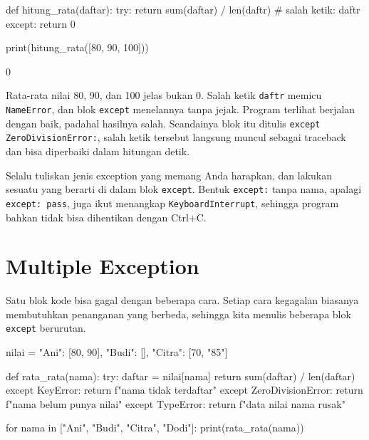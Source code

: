 \begin{kode}
def hitung_rata(daftar):
    try:
        return sum(daftar) / len(daftr)      # salah ketik: daftr
    except:
        return 0

print(hitung_rata([80, 90, 100]))
\end{kode}

\begin{keluaran}
0
\end{keluaran}

Rata-rata nilai 80, 90, dan 100 jelas bukan 0. Salah ketik \texttt{daftr} memicu \texttt{NameError}, dan blok \texttt{except} menelannya tanpa jejak. Program terlihat berjalan dengan baik, padahal hasilnya salah. Seandainya blok itu ditulis \texttt{except ZeroDivisionError:}, salah ketik tersebut langsung muncul sebagai traceback dan bisa diperbaiki dalam hitungan detik.

\begin{penting}
Selalu tuliskan jenis exception yang memang Anda harapkan, dan lakukan sesuatu yang berarti di dalam blok \texttt{except}. Bentuk \texttt{except:} tanpa nama, apalagi \texttt{except: pass}, juga ikut menangkap \texttt{KeyboardInterrupt}, sehingga program bahkan tidak bisa dihentikan dengan Ctrl+C.
\end{penting}

\section{Multiple Exception}

Satu blok kode bisa gagal dengan beberapa cara. Setiap cara kegagalan biasanya membutuhkan penanganan yang berbeda, sehingga kita menulis beberapa blok \texttt{except} berurutan.

\begin{kode}
nilai = {"Ani": [80, 90], "Budi": [], "Citra": [70, "85"]}

def rata_rata(nama):
    try:
        daftar = nilai[nama]
        return sum(daftar) / len(daftar)
    except KeyError:
        return f"{nama} tidak terdaftar"
    except ZeroDivisionError:
        return f"{nama} belum punya nilai"
    except TypeError:
        return f"data nilai {nama} rusak"

for nama in ["Ani", "Budi", "Citra", "Dodi"]:
    print(rata_rata(nama))
\end{kode}

